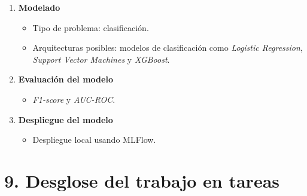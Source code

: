 \documentclass[
11pt, %
]{charter}
\begin{document}
\begin{enumerate}
\begin{itemize}
    \end{itemize}
  \item \textbf{Modelado}
    \begin{itemize}
        \item Tipo de problema: clasificación.
        \item Arquitecturas posibles: modelos de clasificación como \textit{Logistic Regression}, \textit{Support Vector Machines} y \textit{XGBoost}.
    \end{itemize}
  \item \textbf{Evaluación del modelo}
    \begin{itemize}
        \item \textit{F1-score} y \textit{AUC-ROC}.
    \end{itemize}
  \item \textbf{Despliegue del modelo}
    \begin{itemize}
        \item Despliegue local usando MLFlow.
    \end{itemize}
\end{enumerate}

\section{9. Desglose del trabajo en tareas}
\label{sec:wbs}
\end{document}

